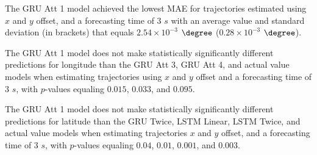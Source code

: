 \begin{table}[!ht]
	\centering
	\caption{The average MAE in $\degree$ ($\times 10^{-3}$), with standard deviation in brackets, across k-fold validation datasets for the trajectories in the k-fold testing datasets estimated using $x$ and $y$ offset, different RNN models, and forecasting times.}
	\label{tab:best_no_abs_MAE}
\end{table}

The GRU Att 1 model achieved the lowest MAE for trajectories estimated using $x$ and $y$ offset, and a forecasting time of $3$ $s$ with an average value and standard deviation (in brackets) that equals $2.54 \times 10^{-3}$ $\degree$ ($0.28 \times 10^{-3}$ $\degree$).

The GRU Att 1 model does not make statistically significantly different predictions for longitude than the GRU Att 3, GRU Att 4, and actual value models when estimating trajectories using $x$ and $y$ offset and a forecasting time of $3$ $s$, with $p$-values equaling $0.015$, $0.033$, and $0.095$.

The GRU Att 1 model does not make statistically significantly different predictions for latitude than the GRU Twice, LSTM Linear, LSTM Twice, and actual value models when estimating trajectories $x$ and $y$ offset, and a forecasting time of $3$ $s$, with $p$-values equaling $0.04$, $0.01$, $0.001$, and $0.003$.

